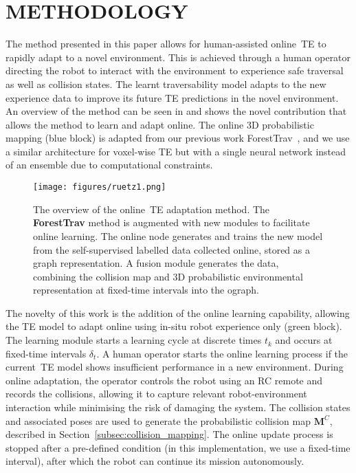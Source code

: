 \section{METHODOLOGY}
\label{ch7:methodology}
The method presented in this paper allows for human-assisted online~\ac{TE} to rapidly adapt to a novel environment. This is achieved through a human operator directing the robot to interact with the environment to experience safe traversal as well as collision states. The learnt traversability model adapts to the new experience data to improve its future \ac{TE} predictions in the novel environment. An overview of the method can be seen in  and shows the novel contribution that allows the method to learn and adapt online. The online 3D probabilistic mapping (blue block) is adapted from our previous work ForestTrav~\cite{ruetz2024foresttrav}, and we use a similar architecture for voxel-wise \ac{TE} but with a single neural network instead of an ensemble due to computational constraints. 

\begin{figure*}[ht]
 \centering
 \texttt{[image: figures/ruetz1.png]}
 \caption[Online Adaptive TE Method Overview]{The overview of the online~\ac{TE} adaptation method. The \textbf{ForestTrav} method is augmented with new modules to facilitate online learning. The online node generates and trains the new model from the self-supervised labelled data collected online, stored as a graph representation. A fusion module generates the data, combining the collision map and 3D probabilistic environmental representation at fixed-time intervals into the \ac{ograph}.}
 \label{fig:odap_overview}
\end{figure*}

The novelty of this work is the addition of the online learning capability, allowing the TE model to adapt online using in-situ robot experience only (green block). The learning module starts a learning cycle at discrete times $t_k$ and occurs at fixed-time intervals $\delta_{t}$.  
%
A human operator starts the online learning process if the current~\ac{TE} model shows insufficient performance in a new environment. During online adaptation, the operator controls the robot using an RC remote and records the collisions, allowing it to capture relevant robot-environment interaction while minimising the risk of damaging the system. The collision states and associated poses are used to generate the probabilistic collision map $\mathbf{M}^C$, described in Section~\ref{subsec:collision_mapping}. The online update process is stopped after a pre-defined condition (in this implementation, we use a fixed-time interval), after which the robot can continue its mission autonomously.

